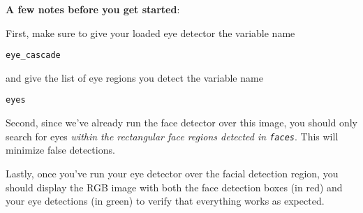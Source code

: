 \documentclass[11pt]{article}
\begin{document}
\textbf{A few notes before you get started}:

First, make sure to give your loaded eye detector the variable name

\texttt{eye\_cascade}

and give the list of eye regions you detect the variable name

\texttt{eyes}

Second, since we've already run the face detector over this image, you
should only search for eyes \emph{within the rectangular face regions
detected in \texttt{faces}}. This will minimize false detections.

Lastly, once you've run your eye detector over the facial detection
region, you should display the RGB image with both the face detection
boxes (in red) and your eye detections (in green) to verify that
everything works as expected.
\end{document}

